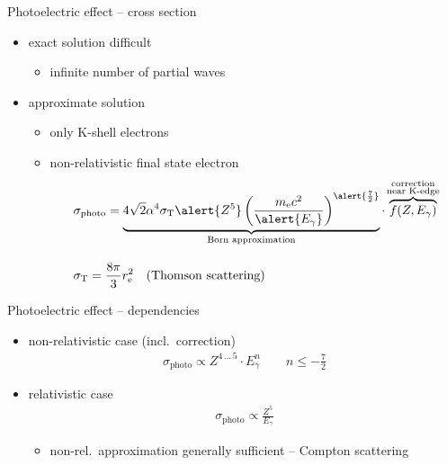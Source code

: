 \documentclass[11pt,xcolor=dvipsnames,professionalfonts,notes]{beamer}
\begin{document}
\begin{frame}{Photoelectric effect -- cross section}
	\begin{itemize}
		\setlength\itemsep{1.5em}
		\item exact solution difficult
		\begin{itemize}
			\item infinite number of partial waves
		\end{itemize}
		\item approximate solution
		\begin{itemize}
			\item only K-shell electrons
			\item non-relativistic final state electron			
			\begin{align*}
				&\sigma_\mathrm{photo} = \underbrace{4\sqrt{2} \alpha^4 \sigma_\mathrm{T} \alert{Z^5}  \left( \frac{m_\mathrm{e}c^2}{\alert{E_\gamma}} \right)^{\alert{\frac{7}{2}}}}_{\text{Born approximation}} \cdot \, \overbrace{f(Z, E_\gamma)}^{\mathclap{\substack{\text{correction}\\\text{near K-edge}}}} \\[1em]
				&\sigma_\mathrm{T} = \frac{8 \pi}{3} r_\mathrm{e}^2 \quad \text{(Thomson scattering)}
			\end{align*}
		\end{itemize}
	\end{itemize}
\end{frame}


\begin{frame}{Photoelectric effect -- dependencies}
	\begin{itemize}
		\setlength\itemsep{1.5em}
		\item non-relativistic case (incl.\ correction)
		\begin{align*}
		\sigma_\mathrm{photo} \propto Z^{4 \, \dots \, 5} \cdot E_\gamma^{n} \qquad n \leq - \frac{7}{2}
		\end{align*}
		
		\item relativistic case
		\begin{align*}
			\sigma_\mathrm{photo} \propto \frac{Z^5}{E_\gamma}
		\end{align*}
		\begin{itemize}
			\item non-rel.\ approximation generally sufficient -- Compton scattering
		\end{itemize} 
	\end{itemize}
\end{frame}
\end{document}

